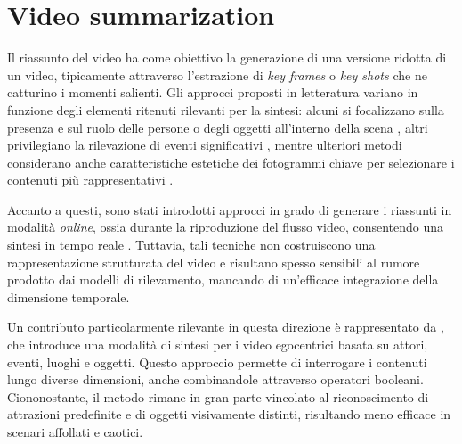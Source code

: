 \section{Video summarization}

Il riassunto del video ha come obiettivo la generazione di una versione ridotta di un video, tipicamente attraverso l'estrazione di \emph{key frames} o \emph{key shots} che ne catturino i momenti salienti. Gli approcci proposti in letteratura variano in funzione degli elementi ritenuti rilevanti per la sintesi: alcuni si focalizzano sulla presenza e sul ruolo delle persone o degli oggetti all'interno della scena \cite{inproceedings0}, altri privilegiano la rilevazione di eventi significativi \cite{Lu_2013_CVPR}, mentre ulteriori metodi considerano anche caratteristiche estetiche dei fotogrammi chiave per selezionare i contenuti più rappresentativi \cite{inproceedings1}. 

Accanto a questi, sono stati introdotti approcci in grado di generare i riassunti in modalità \emph{online}, ossia durante la riproduzione del flusso video, consentendo una sintesi in tempo reale \cite{Lin_2015_ICCV_Workshops,Zhao_2014_CVPR}. Tuttavia, tali tecniche non costruiscono una rappresentazione strutturata del video e risultano spesso sensibili al rumore prodotto dai modelli di rilevamento, mancando di un'efficace integrazione della dimensione temporale.

Un contributo particolarmente rilevante in questa direzione è rappresentato da \cite{Xiong_2015_ICCV}, che introduce una modalità di sintesi per i video egocentrici basata su attori, eventi, luoghi e oggetti. Questo approccio permette di interrogare i contenuti lungo diverse dimensioni, anche combinandole attraverso operatori booleani. Ciononostante, il metodo rimane in gran parte vincolato al riconoscimento di attrazioni predefinite e di oggetti visivamente distinti, risultando meno efficace in scenari affollati e caotici.